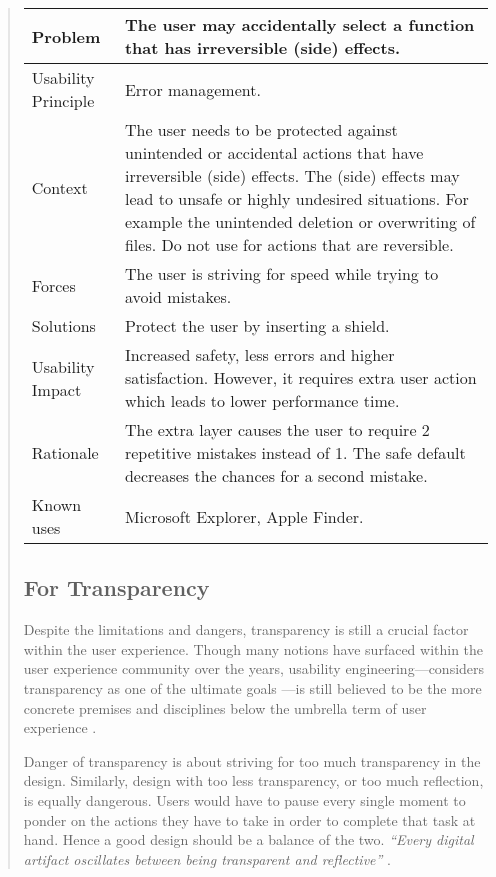 \documentclass[a4paper,titlepage]{article}
\begin{document}
\begin{quote}
\begin{table}[!t]
\begin{center}
\begin{tabular}{| p{} || p{} |}
      Problem & The user may accidentally select a function that has
      irreversible (side) effects. \\ \hline

      Usability Principle & Error management. \\ \hline

      Context & The user needs to be protected against unintended or
      accidental actions that have irreversible (side) effects. The
      (side) effects may lead to unsafe or highly undesired
      situations. For example the unintended deletion or overwriting
      of files. Do not use for actions that are reversible. \\ \hline

      Forces & The user is striving for speed while trying to avoid
      mistakes. \\ \hline

      Solutions & Protect the user by inserting a shield. \\ \hline

      Usability Impact & Increased safety, less errors and higher
      satisfaction. However, it requires extra user action which leads
      to lower performance time. \\ \hline

      Rationale & The extra layer causes the user to require 2
      repetitive mistakes instead of 1. The safe default decreases the
      chances for a second mistake. \\ \hline

      Known uses & Microsoft Explorer, Apple Finder. \\ \hline
    \end{tabular}
  \end{center}
\end{table}

\subsection{For Transparency}
Despite the limitations and dangers, transparency is still a crucial
factor within the user experience. Though many notions have surfaced
within the user experience community over the years, usability
engineering---considers transparency as one of the ultimate goals
\citep{transparency:rutkoski}---is still believed to be the more
concrete premises and disciplines below the umbrella term of user
experience \citep{future:memmel}.

Danger of transparency is about striving for too much transparency in
the design. Similarly, design with too less transparency, or too much
reflection, is equally dangerous. Users would have to pause every
single moment to ponder on the actions they have to take in order to
complete that task at hand. Hence a good design should be a balance of
the two. {\it ``Every digital artifact oscillates between being
  transparent and reflective''} \citep[p.~6]{windows:bolter}.


\end{quote}
\end{document}
